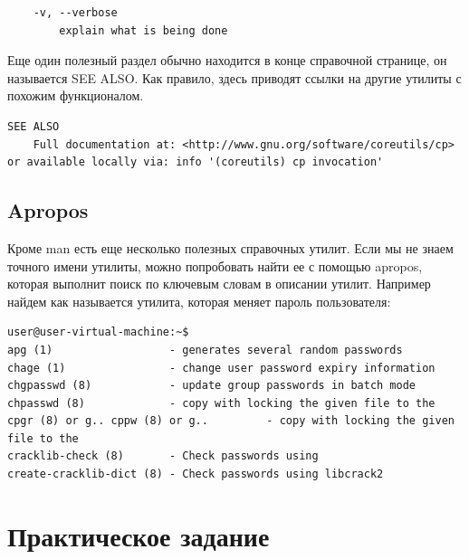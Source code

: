 \documentclass[14pt, a4paper]{article}
\begin{document}
\begin{lstlisting}
    -v, --verbose
        explain what is being done
\end{lstlisting}

Еще один полезный раздел обычно находится в конце справочной странице, он называется
SEE ALSO. Как правило, здесь приводят ссылки на другие утилиты с похожим функционалом.

\begin{lstlisting}
SEE ALSO
    Full documentation at: <http://www.gnu.org/software/coreutils/cp> or available locally via: info '(coreutils) cp invocation'
\end{lstlisting}



\subsection*{Apropos}

Кроме man есть еще несколько полезных справочных утилит. Если мы не знаем точного имени
утилиты, можно попробовать найти ее с помощью apropos, которая выполнит поиск по ключевым
словам в описании утилит. Например найдем как называется утилита, которая меняет пароль
пользователя:

\begin{lstlisting}
user@user-virtual-machine:~$
apg (1)                  - generates several random passwords
chage (1)                - change user password expiry information
chgpasswd (8)            - update group passwords in batch mode
chpasswd (8)             - copy with locking the given file to the
cpgr (8) or g.. cppw (8) or g..         - copy with locking the given file to the
cracklib-check (8)       - Check passwords using
create-cracklib-dict (8) - Check passwords using libcrack2
\end{lstlisting}



\section*{Практическое задание}
\end{document}
